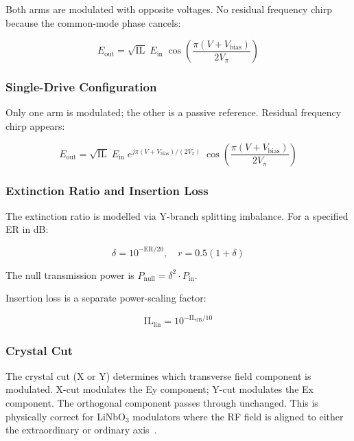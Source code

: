 \documentclass[3p,times,preprint]{elsarticle}
\begin{document}
Both arms are modulated with opposite voltages.  No residual frequency chirp
because the common-mode phase cancels:

\begin{equation}
  E_{\text{out}} = \sqrt{\text{IL}} \; E_{\text{in}} \;
  \cos\!\left(\frac{\pi(V + V_{\text{bias}})}{2V_\pi}\right)
  \label{eq:mzm-pp}
\end{equation}

\subsubsection{Single-Drive Configuration}

Only one arm is modulated; the other is a passive reference.  Residual
frequency chirp appears:

\begin{equation}
  E_{\text{out}} = \sqrt{\text{IL}} \; E_{\text{in}} \;
  e^{j\pi(V + V_{\text{bias}})/(2V_\pi)} \;
  \cos\!\left(\frac{\pi(V + V_{\text{bias}})}{2V_\pi}\right)
  \label{eq:mzm-sd}
\end{equation}

\subsubsection{Extinction Ratio and Insertion Loss}

The extinction ratio is modelled via Y-branch splitting imbalance.
For a specified ER in dB:

\begin{equation}
  \delta = 10^{-\text{ER}/20}, \quad
  r = 0.5(1 + \delta)
\end{equation}

The null transmission power is $P_{\text{null}} = \delta^2 \cdot P_{\text{in}}$.

Insertion loss is a separate power-scaling factor:

\begin{equation}
  \text{IL}_{\text{lin}} = 10^{-\text{IL}_{\text{dB}}/10}
\end{equation}

\subsubsection{Crystal Cut}

The crystal cut (X or Y) determines which transverse field component is
modulated.  X-cut modulates the Ey component; Y-cut modulates the Ex
component.  The orthogonal component passes through unchanged.  This is
physically correct for LiNbO$_3$ modulators where the RF field is aligned
to either the extraordinary or ordinary axis~\cite{weis}.
\end{document}
